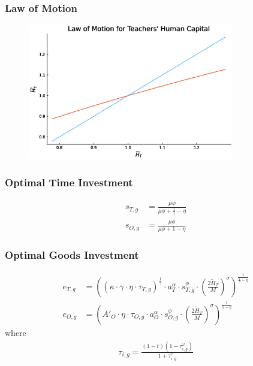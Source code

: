 \documentclass[11pt]{beamer}
\begin{document}
\begin{frame}
\frametitle{Law of Motion}
\begin{figure}
\begin{center}
\includegraphics[width=0.8\textwidth]{LoM.eps}
\label{ }
\end{center}
\end{figure}
\end{frame}

\begin{frame}
	\frametitle{Optimal Time Investment} 
	\label{time_inv}
	\begin{align}
		s_{T,g} & = \frac{\mu \phi}{\mu \phi+\tfrac{1}{\gamma}-\eta} \nonumber\\
		s_{O,g} & = \frac{\mu \phi}{\mu \phi+1-\eta} \nonumber
	\end{align}
	\hyperlink{eqm}{}
\end{frame}

\begin{frame}
	\frametitle{Optimal Goods Investment} 
	\label{good_inv}
	\begin{align}
		e_{T,g} & = \left( \left(\kappa \cdot \gamma \cdot \eta \cdot \tau_{T,g} \right)^\frac{1}{\gamma} \cdot a_T^{\alpha} \cdot s_{T,g}^{\phi} \cdot \left(\tfrac{2\widetilde{H}_T}{M}\right)^{\sigma}\right)^{\frac{1}{\frac{1}{\gamma}-\eta}}  \nonumber\\
		e_{O,g} & = \left( {{A'}_{O}} \cdot \eta \cdot\tau_{O,g} \cdot a_O^\alpha \cdot s_{O,g}^\phi \cdot  \left(\tfrac{2\widetilde{H}_T}{M}\right)^\sigma \right)^{\frac{1}{1-\eta}} \nonumber
	\end{align}
	where
	\begin{align}
		\tau_{i,g} =\frac{(1-t)(1-\tau^{\omega}_{i,g})}{1+\tau^e_{i,g}} \nonumber
	\end{align}
	\hyperlink{eqm}{}
\end{frame}
\end{document}
